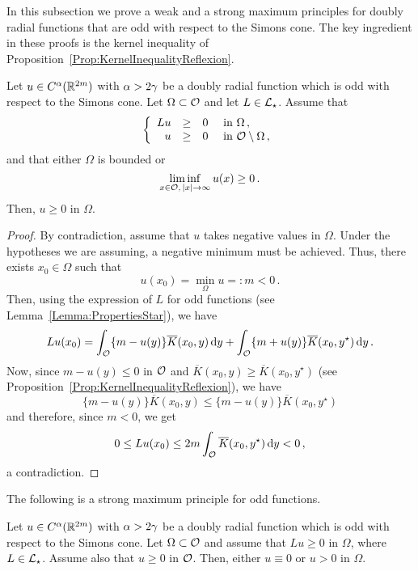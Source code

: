 In this subsection we prove a weak and a strong maximum principles for doubly radial functions that
are odd with respect to the Simons cone. The key ingredient in these proofs is the kernel
inequality of Proposition~\ref{Prop:KernelInequalityReflexion}.

\begin{proposition}
\label{Prop:WeakMaximumPrincipleForOddFunctions} Let $u\in C^{\alpha}(\mathbb{R}^{2m})$ with
$\alpha > 2\gamma$ be a doubly radial function which is odd with respect to the Simons cone. Let
$\Omega \subset \mathcal{O}$ and let $L \in \mathcal{L}_\star$. Assume that
$$
\left\{\begin{array}{rcll}
Lu & \geq & 0 & \text{ in } \Omega\,,\\
u & \geq & 0 & \text{ in } \mathcal{O} \setminus \Omega\,,
\end{array} \right.
$$
and that either $\Omega$ is bounded or 
$$
\liminf_{x \in \mathcal{O},\,|x|\to \infty} u(x) \geq 0\,.
$$
Then, $u \geq 0$ in $\Omega$.
\end{proposition}

\begin{proof}
By contradiction, assume that $u$ takes negative values in $\Omega$. Under the hypotheses we are
assuming, a negative minimum must be achieved. Thus, there exists $x_0\in \Omega$ such that
$$
u(x_0) = \min_{\Omega} u =: m < 0\,.
$$
Then, using the expression of $L$ for odd functions (see Lemma~\ref{Lemma:PropertiesStar}), we have
$$
Lu (x_0) = \int_{\mathcal{O}} \{m - u(y) \} \overline{K}(x_0, y) \,\mathrm{d} y +  \int_{\mathcal{O}} \{m + u(y) \} \overline{K}(x_0, y^\star) \,\mathrm{d} y\,.
$$
Now, since $m - u(y) \leq 0$ in $\mathcal{O}$ and $\overline{K}(x_0, y) \geq \overline{K}(x_0, y^\star)$ (see Proposition~\ref{Prop:KernelInequalityReflexion}), we have
$$
\{m - u(y) \} \overline{K}(x_0, y) \leq \{m - u(y) \} \overline{K}(x_0, y^\star)
$$
and therefore, since $m<0$, we get
$$
0 \leq L u(x_0) \leq 2m \int_{\mathcal{O}} \overline{K}(x_0, y^\star) \,\mathrm{d} y < 0\,,
$$
a contradiction.
\end{proof}

The following is a strong maximum principle for odd functions.

\begin{proposition}
\label{Prop:StrongMaximumPrincipleForOddFunctions} Let $u\in C^{\alpha}(\mathbb{R}^{2m})$ with
$\alpha > 2\gamma$ be a doubly radial function which is odd with respect to the Simons cone.  Let
$\Omega \subset \mathcal{O}$ and assume that $Lu \geq 0$ in $\Omega$, where $L \in \mathcal{L}_\star$. Assume also that $u\geq 0$ in $\mathcal{O}$.
Then, either $u\equiv 0$ or $u > 0$ in $\Omega$.
\end{proposition}

